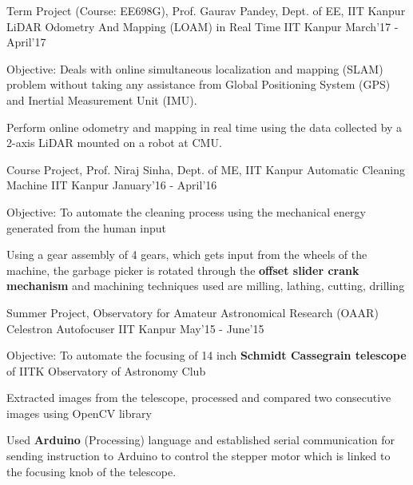 \begin{cventries}
  \cventry
  {Term Project (Course: EE698G), Prof. Gaurav Pandey, Dept. of EE, IIT Kanpur}
  {LiDAR Odometry And Mapping (LOAM) in Real Time}
  {IIT Kanpur}
  {March'17 - April'17}
  {
  	\begin{cvitems}
  	  \item {Objective: Deals with online simultaneous localization and mapping (SLAM) problem without
taking any assistance from Global Positioning System (GPS) and Inertial Measurement Unit
(IMU).}
	  \item {Perform online odometry and mapping in real time
using the data collected by a 2-axis LiDAR mounted on a robot at CMU.}
  	\end{cvitems}
  }
  
  \cventry
    {Course Project,  Prof. Niraj Sinha, Dept. of ME, IIT Kanpur}
    {Automatic Cleaning Machine}
    {IIT Kanpur}
    {January’16 - April’16}
    {
      \begin{cvitems}
        \item {Objective: To automate the cleaning process using the mechanical energy generated from the human input}
        \item {Using a gear assembly of 4 gears, which gets input from the wheels of the machine, the garbage picker is rotated through the \textbf{offset slider crank mechanism} and machining techniques used are milling, lathing, cutting, drilling}
      \end{cvitems}
    }  
  \cventry
    {Summer Project, Observatory for Amateur Astronomical Research (OAAR)}
    {Celestron Autofocuser}
    {IIT Kanpur}
    {May'15 - June’15}
    {
      \begin{cvitems}
        \item {Objective: To automate the focusing of 14 inch \textbf{Schmidt Cassegrain telescope} of IITK Observatory of Astronomy Club}
        \item {Extracted images from the telescope, processed and compared two consecutive images using OpenCV library}
        \item {Used \textbf{Arduino} (Processing) language and established serial communication for sending instruction to Arduino to control the stepper motor which is linked to the focusing knob of the telescope.}
      \end{cvitems}
    }


\end{cventries}
